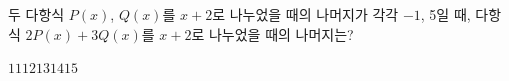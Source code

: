 두 다항식 $P(x)$, $Q(x)$를 $x+2$로 나누었을 때의 나머지가 각각 $-1$, 5일 때, 다항식 $2P(x)+3Q(x)$를 $x+2$로 나누었을 때의 나머지는?
\begin{choices32}{$11$}{$12$}{$13$}{$14$}{$15$}\end{choices32}
